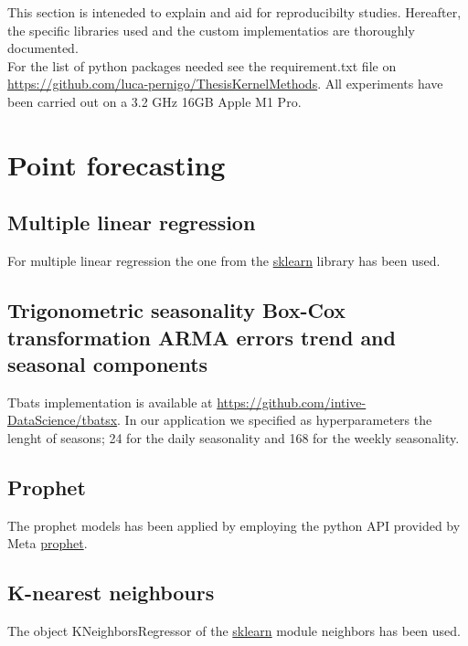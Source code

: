 This section is inteneded to explain and aid for reproducibilty studies. Hereafter, the specific libraries used and the custom implementatios are thoroughly documented.
\\
For the list of python packages needed see the requirement.txt file on \url{https://github.com/luca-pernigo/ThesisKernelMethods}\label{github_repo}.
All experiments have been carried out on a 3.2 GHz 16GB Apple M1 Pro.







\section{Point forecasting}
\subsection{Multiple linear regression}
For multiple linear regression the one from the \href{https://scikit-learn.org/stable/}{sklearn} library has been used.

\subsection{Trigonometric seasonality Box-Cox transformation ARMA errors trend and seasonal components}
Tbats implementation is available at \url{https://github.com/intive-DataScience/tbatsx}.
In our application we specified as hyperparameters the lenght of seasons; 24 for the daily seasonality and 168 for the weekly seasonality.

\subsection{Prophet}
The prophet models has been applied by employing the python API provided by Meta \href{https://facebook.github.io/prophet/docs/quick_start.html}{prophet}.

\subsection{K-nearest neighbours}
The object KNeighborsRegressor of the \href{https://scikit-learn.org/stable/}{sklearn} module neighbors has been used.

